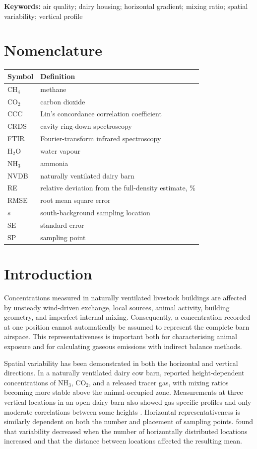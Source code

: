 \documentclass[12pt,a4paper]{article}
\begin{document}
\noindent\textbf{Keywords:}
air quality; dairy housing; horizontal gradient; mixing ratio; spatial
variability; vertical profile

\section*{Nomenclature}

\begin{tabular}{>{\raggedright\arraybackslash}p{2.2cm}
                >{\raggedright\arraybackslash}p{10.8cm}}
\toprule
Symbol & Definition\\
\midrule
\(\mathrm{CH_4}\) & methane\\
\(\mathrm{CO_2}\) & carbon dioxide\\
CCC & Lin's concordance correlation coefficient\\
CRDS & cavity ring-down spectroscopy\\
FTIR & Fourier-transform infrared spectroscopy\\
\(\mathrm{H_2O}\) & water vapour\\
\(\mathrm{NH_3}\) & ammonia\\
NVDB & naturally ventilated dairy barn\\
RE & relative deviation from the full-density estimate, \%\\
RMSE & root mean square error\\
\(s\) & south-background sampling location\\
SE & standard error\\
SP & sampling point\\
\bottomrule
\end{tabular}

\section{Introduction}

Concentrations measured in naturally ventilated livestock buildings are
affected by unsteady wind-driven exchange, local sources, animal activity,
building geometry, and imperfect internal mixing. Consequently, a
concentration recorded at one position cannot automatically be assumed to
represent the complete barn airspace. This representativeness is important
both for characterising animal exposure and for calculating gaseous emissions
with indirect balance methods.

Spatial variability has been demonstrated in both the horizontal and vertical
directions. In a naturally ventilated dairy cow barn, \citet{Mendes2015}
reported height-dependent concentrations of \(\mathrm{NH_3}\),
\(\mathrm{CO_2}\), and a released tracer gas, with mixing ratios becoming more
stable above the animal-occupied zone. Measurements at three vertical
locations in an open dairy barn also showed gas-specific profiles and only
moderate correlations between some heights \citep{Durso2024}. Horizontal
representativeness is similarly dependent on both the number and placement of
sampling points. \citet{Durso2022} found that variability decreased when the
number of horizontally distributed locations increased and that the distance
between locations affected the resulting mean.
\end{document}
